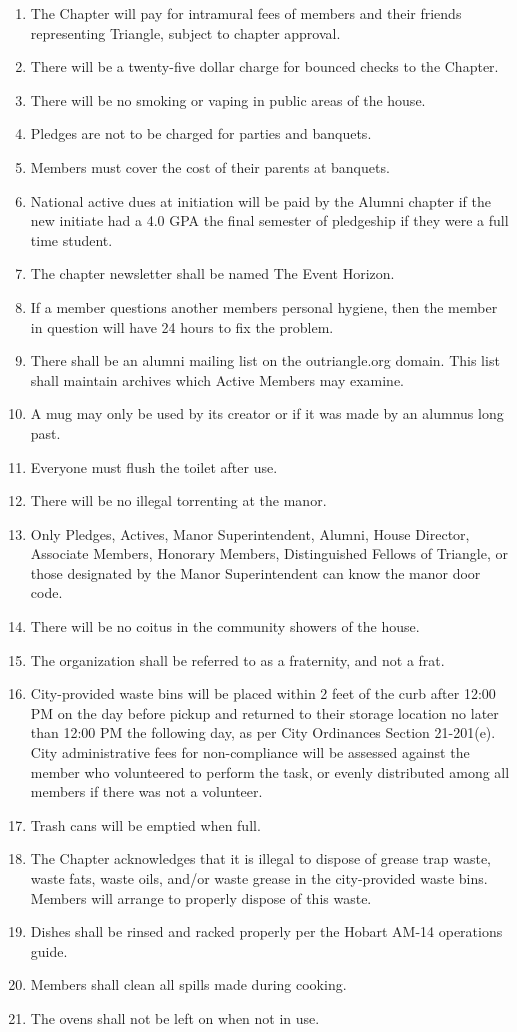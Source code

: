 \begin{enumerate}
\item The Chapter will pay for intramural fees of members and their friends representing Triangle, subject to chapter approval. 
\item There will be a twenty-five dollar charge for bounced checks to the Chapter. 
\item There will be no smoking or vaping in public areas of the house.  
\item Pledges are not to be charged for parties and banquets.  
\item Members must cover the cost of their parents at banquets.  
\item National active dues at initiation will be paid by the Alumni chapter if the new initiate had a 4.0 GPA the final semester of pledgeship if they were a full time student.
\item The chapter newsletter shall be named The Event Horizon. 
\item If a member questions another members personal hygiene, then the member in question will have 24 hours to fix the problem.
\item There shall be an alumni mailing list on the outriangle.org domain. This list shall maintain archives which Active Members may examine.
\item A mug may only be used by its creator or if it was made by an alumnus long past.
\item Everyone must flush the toilet after use.
\item There will be no illegal torrenting at the manor.
\item Only Pledges, Actives, Manor Superintendent, Alumni, House Director, Associate Members, Honorary Members, Distinguished Fellows of Triangle, or those designated by the Manor Superintendent can know the manor door code.
\item There will be no coitus in the community showers of the house.
\item The organization shall be referred to as a fraternity, and not a frat.
\item City-provided waste bins will be placed within 2 feet of the curb after 12:00 PM on the day before pickup and returned to their storage location no later than 12:00 PM the following day, as per City Ordinances Section 21-201(e). City administrative fees for non-compliance will be assessed against the member who volunteered to perform the task, or evenly distributed among all members if there was not a volunteer.
\item Trash cans will be emptied when full.
\item The Chapter acknowledges that it is illegal to dispose of grease trap waste, waste fats, waste oils, and/or waste grease in the city-provided waste bins. Members will arrange to properly dispose of this waste.
\item Dishes shall be rinsed and racked properly per the Hobart AM-14 operations guide.
\item Members shall clean all spills made during cooking.
\item The ovens shall not be left on when not in use.
\end{enumerate}
